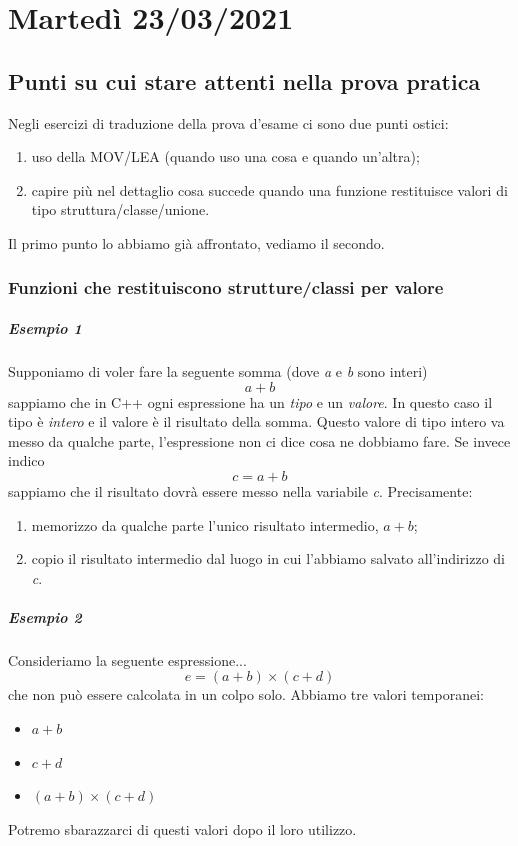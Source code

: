 
\chapter{Martedì 23/03/2021}
\section{Punti su cui stare attenti nella prova pratica} Negli esercizi di traduzione della prova d'esame ci sono due punti ostici:
\begin{enumerate}
	\item uso della MOV/LEA (quando uso una cosa e quando un'altra);
	\item capire più nel dettaglio cosa succede quando una funzione restituisce valori di tipo struttura/classe/unione.
\end{enumerate}
Il primo punto lo abbiamo già affrontato, vediamo il secondo. 
\subsection{Funzioni che restituiscono strutture/classi per valore}
\paragraph{Esempio 1} Supponiamo di voler fare la seguente somma (dove \emph{a} e \emph{b} sono interi)
\[a+b\]
sappiamo che in C++ ogni espressione ha un \emph{tipo} e un \emph{valore}. In questo caso il tipo è \emph{intero} e il valore è il risultato della somma. Questo valore di tipo intero va messo da qualche parte, l'espressione non ci dice cosa ne dobbiamo fare. Se invece indico
\[c=a+b\]
sappiamo che il risultato dovrà essere messo nella variabile \emph{c}. Precisamente:
\begin{enumerate}
	\item memorizzo da qualche parte l'unico risultato intermedio, $a+b$;
	\item copio il risultato intermedio dal luogo in cui l'abbiamo salvato all'indirizzo di \emph{c}.
\end{enumerate}
\paragraph{Esempio 2} Consideriamo la seguente espressione...
\[e=(a+b) \times (c+d)\]
che non può essere calcolata in un colpo solo. Abbiamo tre valori temporanei:
\begin{itemize}
	\item $a+b$
	\item $c+d$
	\item $(a+b) \times (c+d)$
\end{itemize} 
Potremo sbarazzarci di questi valori dopo il loro utilizzo.

